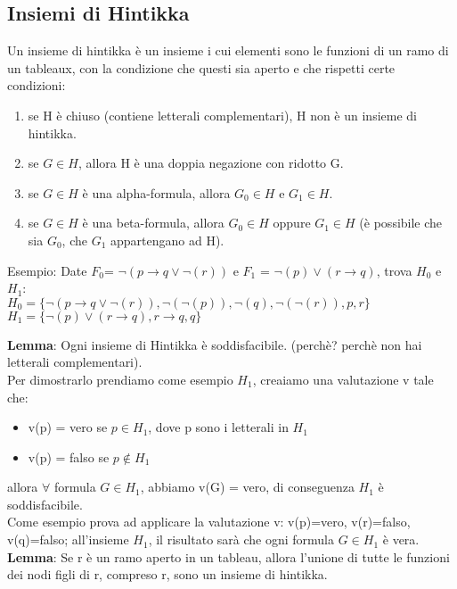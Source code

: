 \documentclass[11pt]{article}
\begin{document}
\subsection{Insiemi di Hintikka}
Un insieme di hintikka è un insieme i cui elementi sono le funzioni di un ramo di un tableaux, con la condizione che questi sia aperto e che rispetti certe condizioni:\\
\begin{enumerate}
    \item se H è chiuso (contiene letterali complementari), H non è un insieme di hintikka.
    \item se $G \in H$, allora H è una doppia negazione con ridotto G.
    \item se $G \in H$ è una alpha-formula, allora $G_{0} \in H$ e $G_{1} \in H$.
    \item se $G \in H$ è una beta-formula, allora $G_{0} \in H$ oppure $G_{1} \in H$ (è possibile che sia $G_{0}$, che $G_{1}$ appartengano ad H).
\end{enumerate}
Esempio: Date $F_{0}$= $\neg(p \rightarrow q \lor \neg(r))$ e $F_{1}$ = $\neg(p) \lor (r \rightarrow q)$, trova $H_{0}$ e $H_{1}$:\\
$H_{0} = \{\neg(p \rightarrow q \lor \neg(r)), \neg(\neg(p)), \neg(q), \neg(\neg(r)), p, r\}$\\
$H_{1} = \{\neg(p) \lor (r \rightarrow q), r \rightarrow q, q\}$


\textbf{Lemma}: Ogni insieme di Hintikka è soddisfacibile. (perchè? perchè non hai letterali complementari).\\
Per dimostrarlo prendiamo come esempio $H_{1}$, creaiamo una valutazione v tale che:\\
\begin{itemize}
    \item v(p) = vero se $p \in H_{1}$, dove p sono i letterali in $H_{1}$
    \item v(p) = falso se $p \notin H_{1}$
\end{itemize}
allora $\forall$ formula $G \in H_{1}$, abbiamo v(G) = vero, di conseguenza $H_{1}$ è soddisfacibile.\\
Come esempio prova ad applicare la valutazione v: v(p)=vero, v(r)=falso, v(q)=falso; all'insieme $H_{1}$, il risultato sarà che ogni formula $G \in H_{1}$ è vera.
\textbf{Lemma}: Se r è un ramo aperto in un tableau, allora l'unione di tutte le funzioni dei nodi figli di r, compreso r, sono un insieme di hintikka.\\
\end{document}
